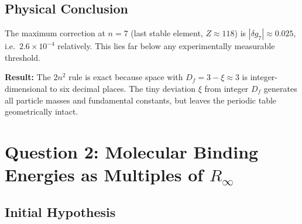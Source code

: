 \begin{table}[htbp]
\centering
\caption{T0 correction of shell degeneracy $g_n^{(\mathrm{T0})} = 2n^{2-\xi}$}
\label{tab:gn-correction}
\end{table}

\subsection{Physical Conclusion}
\label{subsec:conclusion-gn}

The maximum correction at $n=7$ (last stable element, $Z \approx 118$)
is $|\delta g_7| \approx 0.025$, i.e.\ $2.6 \times 10^{-4}$ relatively.
This lies far below any experimentally measurable threshold.

\textbf{Result:} The $2n^2$ rule is exact because space with
$D_f = 3 - \xi \approx 3$ is integer-dimensional to six decimal places.
The tiny deviation $\xi$ from integer $D_f$ generates all
particle masses and fundamental constants, but leaves the periodic table
geometrically intact.

\section{Question 2: Molecular Binding Energies as Multiples of \texorpdfstring{$R_\infty$}{R\_inf}}
\label{sec:binding-energies}

\subsection{Initial Hypothesis}
\label{subsec:hypothesis-be}


